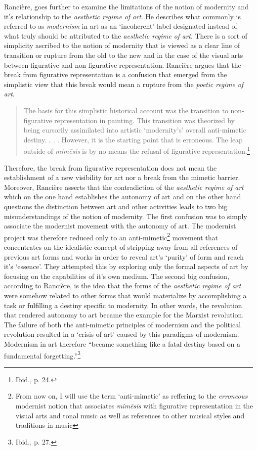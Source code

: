 Ranci\`{e}re, goes further to examine the limitations of the notion of modernity and it's relationship to the \emph{aesthetic regime of art}. He describes what commonly is referred to as \emph{modernism} in art as an `incoherent' label designated instead of what truly should be attributed to the \emph{aesthetic regime of art}. There is a sort of simplicity ascribed to the notion of modernity that is viewed as a clear line of transition or rupture from the old to the new and in the case of the visual arts between figurative and non-figurative representation. Ranci\`{e}re argues that the break from figurative representation is a confusion that emerged from the simplistic view that this break would mean a rupture from the \emph{poetic regime of art}.

\begin{quote}
The basis for this simplistic historical account was the transition to non-figurative representation in painting. This transition was theorized by being cursorily assimilated into artistic `modernity's' overall anti-mimetic destiny. . . . However, it is the starting point that is erroneous. The leap outside of \emph{mim\={e}sis} is by no means the refusal of figurative representation.\footnote{Ibid., p. 24.}
\end{quote}

Therefore, the break from figurative representation does not mean the establishment of a new visibility for art nor a break from the mimetic barrier. Moreover, Ranci\`{e}re asserts that the contradiction of the \emph{aesthetic regime of art} which on the one hand establishes the autonomy of art and on the other hand questions the distinction between art and other activities leads to two big misunderstandings of the notion of modernity. The first confusion was to simply associate the modernist movement with the autonomy of art. The modernist project was therefore reduced only to an anti-mimetic\footnote{From now on, I will use the term `anti-mimetic' as reffering to the \emph{erroneous} modernist notion that associates \emph{mim\={e}sis} with figurative representation in the visual arts and tonal music as well as references to other musical styles and traditions in music} movement that concentrates on the idealistic concept of stripping away from all references of previous art forms and works in order to reveal art's `purity' of form and reach it's `essence'. They attempted this by exploring only the formal aspects of art by focusing on the capabilities of it's own medium. The second big confusion, according to Ranci\`{e}re, is the idea that the forms of the \emph{aesthetic regime of art} were somehow related to other forms that would materialize by accomplishing a task or fulfilling a destiny specific to modernity. In other words, the revolution that rendered autonomy to art became the example for the Marxist revolution. The failure of both the anti-mimetic principles of modernism and the political revolution resulted in a `crisis of art' caused by this paradigms of modernism. Modernism in art therefore ``became something like a fatal destiny based on a fundamental forgetting.''\footnote{Ibid., p. 27.} 

